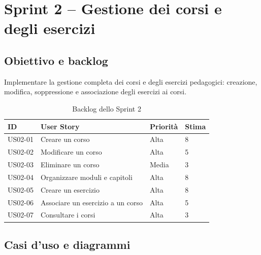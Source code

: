 \section{Sprint 2 -- Gestione dei corsi e degli esercizi}
\label{sec:sprint2}

\subsection{Obiettivo e backlog}
\label{subsec:sprint2-obiettivo}

Implementare la gestione completa dei corsi e degli esercizi pedagogici: creazione, modifica, soppressione e associazione degli esercizi ai corsi.

\begin{table}[H]
    \centering
    \caption{Backlog dello Sprint 2}
    \label{tab:sprint2-backlog}
    \renewcommand{\arraystretch}{1.3}
    \begin{tabular}{|p{1.8cm}|p{7cm}|p{2.5cm}|p{1.5cm}|}
        \hline
        \textbf{ID} & \textbf{User Story} & \textbf{Priorità} & \textbf{Stima} \\
        \hline
        US02-01 & Creare un corso & Alta & 8 \\
        \hline
        US02-02 & Modificare un corso & Alta & 5 \\
        \hline
        US02-03 & Eliminare un corso & Media & 3 \\
        \hline
        US02-04 & Organizzare moduli e capitoli & Alta & 8 \\
        \hline
        US02-05 & Creare un esercizio & Alta & 8 \\
        \hline
        US02-06 & Associare un esercizio a un corso & Alta & 5 \\
        \hline
        US02-07 & Consultare i corsi & Alta & 3 \\
        \hline
    \end{tabular}
\end{table}

\subsection{Casi d'uso e diagrammi}
\label{subsec:sprint2-casi-uso}

